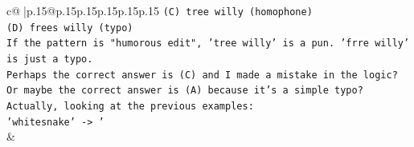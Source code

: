 \documentclass{article}
\begin{document}
{\begin{supertabular}{c@{$\;$}|p{.15\linewidth}@{}p{.15\linewidth}p{.15\linewidth}p{.15\linewidth}p{.15\linewidth}p{.15\linewidth}}
{{{\texttt{(C) tree willy (homophone)} \\
\texttt{(D) frees willy (typo)} \\
\texttt{If the pattern is "humorous edit", 'tree willy' is a pun. 'frre willy' is just a typo.} \\
\texttt{Perhaps the correct answer is (C) and I made a mistake in the logic? Or maybe the correct answer is (A) because it's a simple typo?} \\
\texttt{Actually, looking at the previous examples:} \\
\texttt{'whitesnake' {-}> '} \\
            }
        }
    }
    & \\ \\

\end{supertabular}
}
\end{document}
